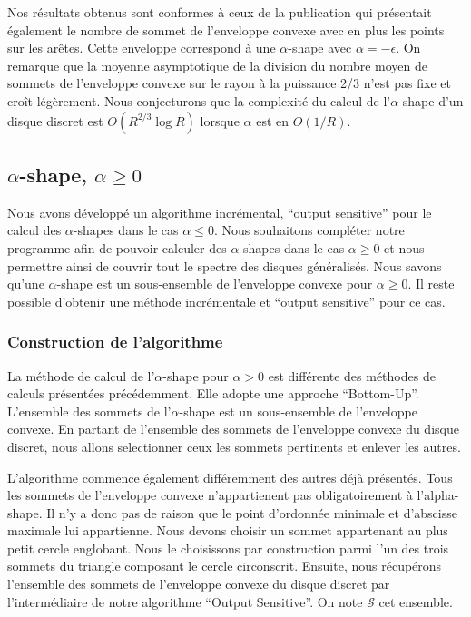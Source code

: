 Nos résultats obtenus sont conformes à ceux de la publication \cite{HarPeled98} qui présentait également le nombre de sommet de l'enveloppe convexe avec en plus les points sur les arêtes. Cette enveloppe correspond à une $\alpha$-shape avec $\alpha = -\epsilon$. On remarque que la moyenne asymptotique de la division du nombre moyen de sommets de l'enveloppe convexe sur le rayon à la puissance 2/3 n'est pas fixe et croît légèrement. Nous conjecturons que la complexité du calcul de l'$\alpha$-shape d'un disque discret est $O(R^{2/3} \log R)$ lorsque $\alpha$ est en $O(1/R)$. 

\subsection{$\alpha$-shape, $\alpha \geq 0$}

Nous avons développé un algorithme incrémental, ``output sensitive'' pour le calcul des $\alpha$-shapes dans le cas $\alpha \leq 0$. Nous souhaitons compléter notre programme afin de pouvoir calculer des $\alpha$-shapes dans le cas $\alpha \geq 0$ et nous permettre ainsi de couvrir tout le spectre des disques généralisés. Nous savons qu'une $\alpha$-shape est un sous-ensemble de l'enveloppe convexe pour $\alpha \geq 0$. Il reste possible d'obtenir une méthode incrémentale et ``output sensitive'' pour ce cas.


\subsubsection{Construction de l'algorithme}

La méthode de calcul de l'$\alpha$-shape pour $\alpha > 0$ est différente des méthodes de calculs présentées précédemment. Elle adopte une approche ``Bottom-Up''. L'ensemble des sommets de l'$\alpha$-shape est un sous-ensemble de l'enveloppe convexe. En partant de l'ensemble des sommets de l'enveloppe convexe du disque discret, nous allons selectionner ceux les sommets pertinents et enlever les autres.

L'algorithme commence également différemment des autres déjà présentés. Tous les sommets de l'enveloppe convexe n'appartienent pas obligatoirement à l'alpha-shape. Il n'y a donc pas de raison que le point d'ordonnée minimale et d'abscisse maximale lui appartienne. Nous devons choisir un sommet appartenant au plus petit cercle englobant. Nous le choisissons par construction parmi l'un des trois sommets du triangle composant le cercle circonscrit. Ensuite, nous récupérons l'ensemble des sommets de l'enveloppe convexe du disque discret par l'intermédiaire de notre algorithme ``Output Sensitive''. On note $\mathcal{S}$ cet ensemble.

